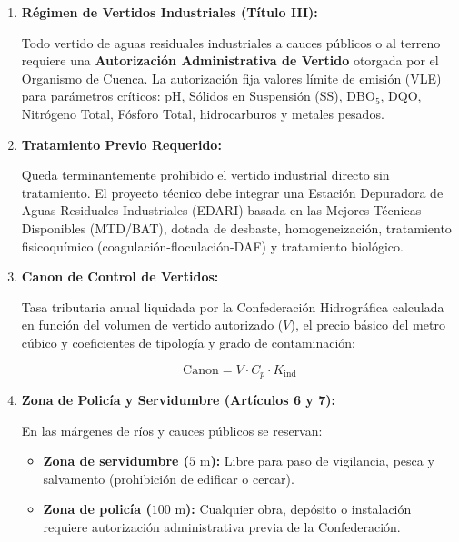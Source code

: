 \documentclass{report}
\begin{document}
\begin{enumerate}

    \item \textbf{Régimen de Vertidos Industriales (Título III):}

          Todo vertido de aguas residuales industriales a cauces públicos o al terreno requiere una \textbf{Autorización Administrativa de Vertido} otorgada por el Organismo de Cuenca. La autorización fija valores límite de emisión (VLE) para parámetros críticos: pH, Sólidos en Suspensión (SS), DBO$_5$, DQO, Nitrógeno Total, Fósforo Total, hidrocarburos y metales pesados.

    \item \textbf{Tratamiento Previo Requerido:}

          Queda terminantemente prohibido el vertido industrial directo sin tratamiento. El proyecto técnico debe integrar una Estación Depuradora de Aguas Residuales Industriales (EDARI) basada en las Mejores Técnicas Disponibles (MTD/BAT), dotada de desbaste, homogeneización, tratamiento fisicoquímico (coagulación-floculación-DAF) y tratamiento biológico.

    \item \textbf{Canon de Control de Vertidos:}

          Tasa tributaria anual liquidada por la Confederación Hidrográfica calculada en función del volumen de vertido autorizado ($V$), el precio básico del metro cúbico y coeficientes de tipología y grado de contaminación:

          \begin{equation}

              \text{Canon} = V \cdot C_p \cdot K_{\text{ind}}

          \end{equation}

    \item \textbf{Zona de Policía y Servidumbre (Artículos 6 y 7):}

          En las márgenes de ríos y cauces públicos se reservan:

          \begin{itemize}

              \item \textbf{Zona de servidumbre ($5\text{ m}$):} Libre para paso de vigilancia, pesca y salvamento (prohibición de edificar o cercar).

              \item \textbf{Zona de policía ($100\text{ m}$):} Cualquier obra, depósito o instalación requiere autorización administrativa previa de la Confederación.

          \end{itemize}

\end{enumerate}
\end{document}
